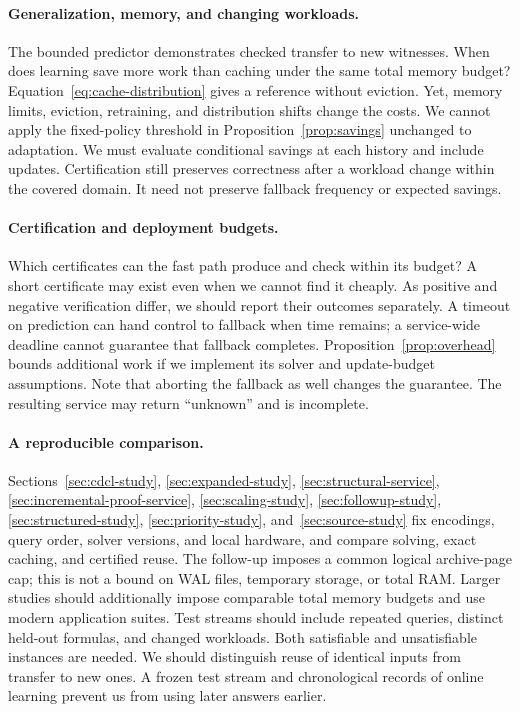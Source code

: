 \documentclass[11pt,a4paper]{article}
\numberwithin{equation}{section}
\theoremstyle{plain}
\theoremstyle{definition}
\theoremstyle{remark}
\begin{document}
\paragraph{Generalization, memory, and changing workloads.}
The bounded predictor demonstrates checked transfer to new witnesses. When does learning save more work than caching under the same total memory budget? Equation~\eqref{eq:cache-distribution} gives a reference without eviction. Yet, memory limits, eviction, retraining, and distribution shifts change the costs. We cannot apply the fixed-policy threshold in Proposition~\ref{prop:savings} unchanged to adaptation. We must evaluate conditional savings at each history and include updates. Certification still preserves correctness after a workload change within the covered domain. It need not preserve fallback frequency or expected savings.

\paragraph{Certification and deployment budgets.}
Which certificates can the fast path produce and check within its budget? A short certificate may exist even when we cannot find it cheaply. As positive and negative verification differ, we should report their outcomes separately. A timeout on prediction can hand control to fallback when time remains; a service-wide deadline cannot guarantee that fallback completes. Proposition~\ref{prop:overhead} bounds additional work if we implement its solver and update-budget assumptions. Note that aborting the fallback as well changes the guarantee. The resulting service may return ``unknown'' and is incomplete.

\paragraph{A reproducible comparison.}
Sections~\ref{sec:cdcl-study}, \ref{sec:expanded-study}, \ref{sec:structural-service}, \ref{sec:incremental-proof-service}, \ref{sec:scaling-study}, \ref{sec:followup-study}, \ref{sec:structured-study}, \ref{sec:priority-study}, and~\ref{sec:source-study} fix encodings, query order, solver versions, and local hardware, and compare solving, exact caching, and certified reuse. The follow-up imposes a common logical archive-page cap; this is not a bound on WAL files, temporary storage, or total RAM. Larger studies should additionally impose comparable total memory budgets and use modern application suites. Test streams should include repeated queries, distinct held-out formulas, and changed workloads. Both satisfiable and unsatisfiable instances are needed. We should distinguish reuse of identical inputs from transfer to new ones. A frozen test stream and chronological records of online learning prevent us from using later answers earlier.
\end{document}
